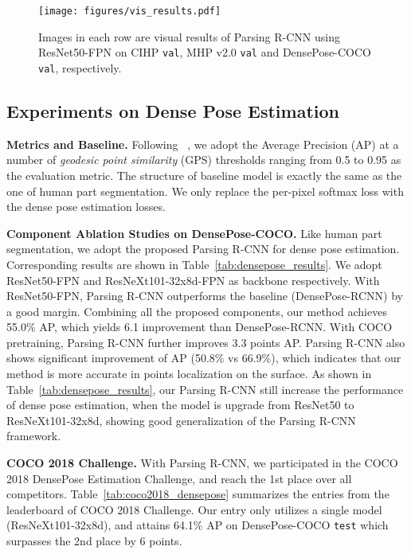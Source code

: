\documentclass[10pt,twocolumn,letterpaper]{article}
\begin{document}
\begin{figure*}
\begin{center}
\texttt{[image: figures/vis\_results.pdf]}
\end{center}
\vspace{-1mm}
\caption{Images in each row are visual results of Parsing R-CNN using ResNet50-FPN on CIHP \texttt{val}, MHP v2.0 \texttt{val} and DensePose-COCO \texttt{val}, respectively.}
\label{fig:vis_results}
\end{figure*}


\subsection{Experiments on Dense Pose Estimation} 
\vspace{6pt}
\noindent\textbf{Metrics and Baseline.} Following ~\cite{Guler_cvpr2018_densepose}, we adopt the Average Precision (AP) at a number of \emph{geodesic point similarity} (GPS) thresholds ranging from 0.5 to 0.95 as the evaluation metric. The structure of baseline model is exactly the same as the one of human part segmentation. We only replace the per-pixel softmax loss with the dense pose estimation losses.

\vspace{6pt}
\noindent\textbf{Component Ablation Studies on DensePose-COCO.} Like human part segmentation, we adopt the proposed Parsing R-CNN for dense pose estimation. Corresponding results are shown in Table~\ref{tab:densepose_results}. We adopt ResNet50-FPN and ResNeXt101-32x8d-FPN as backbone respectively. With ResNet50-FPN, Parsing R-CNN outperforms the baseline (DensePose-RCNN) by a good margin. Combining all the proposed components, our method achieves 55.0\% AP, which yields 6.1 improvement than DensePose-RCNN. With COCO pretraining, Parsing R-CNN further improves 3.3 points AP. Parsing R-CNN also shows significant improvement of AP (50.8\% vs 66.9\%), which indicates that our method is more accurate in points localization on the surface. As shown in Table~\ref{tab:densepose_results}, our Parsing R-CNN still increase the performance of dense pose estimation, when  the model is upgrade from ResNet50 to ResNeXt101-32x8d, showing good generalization of the Parsing R-CNN framework.

\vspace{6pt}
\noindent\textbf{COCO 2018 Challenge.} With Parsing R-CNN, we participated in the COCO 2018 DensePose Estimation Challenge, and reach the 1st place over all competitors. Table~\ref{tab:coco2018_densepose} summarizes the entries from the leaderboard of COCO 2018 Challenge. Our entry only utilizes a single model (ResNeXt101-32x8d), and attains 64.1\% AP on DensePose-COCO \texttt{test} which surpasses the 2nd place by 6 points.
\end{document}
